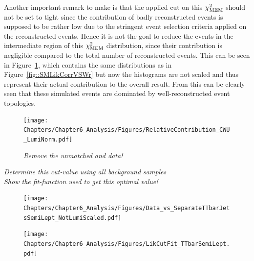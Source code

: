 Another important remark to make is that the applied cut on this $\chi^{2}_{\textrm{MEM}}$ should not be set to tight since the contribution of badly reconstructed events is supposed to be rather low due to the stringent event selection criteria applied on the reconstructed events. Hence it is not the goal to reduce the events in the intermediate region of this $\chi^{2}_{\textrm{MEM}}$ distribution, since their contribution is negligible compared to the total number of reconstructed events. This can be seen in Figure~\ref{fig::SMLikCorrVSWrUnSc}, which contains the same distributions as in Figure~\ref{fig::SMLikCorrVSWr} but now the histograms are not scaled and thus represent their actual contribution to the overall result. From this can be clearly seen that these simulated events are dominated by well-reconstructed event topologies.
\\
\begin{figure}[h!t]
 \centering
 \texttt{[image: Chapters/Chapter6\_Analysis/Figures/RelativeContribution\_CWU\_LumiNorm.pdf]}
 \caption{\textit{Remove the unmatched and data!}} \label{fig::SMLikCorrVSWrUnSc}
\end{figure}

\textit{Determine this cut-value using all background samples}\\
\textit{Show the fit-function used to get this optimal value!}
\begin{figure}[h!t]
 \centering
 \texttt{[image: Chapters/Chapter6\_Analysis/Figures/Data\_vs\_SeparateTTbarJetsSemiLept\_NotLumiScaled.pdf]}
 \caption{} \label{fig::OptCutValue}
\end{figure}

\begin{figure}[h!t]
 \centering
 \texttt{[image: Chapters/Chapter6\_Analysis/Figures/LikCutFit\_TTbarSemiLept.pdf]}
 \caption{} \label{fig::CutValueFit}
\end{figure}


%


